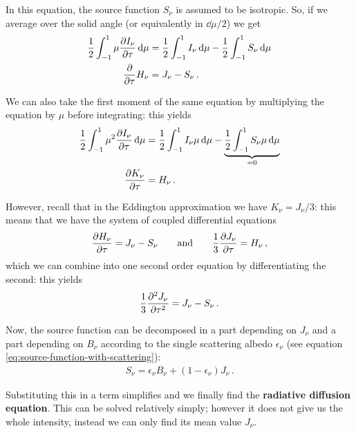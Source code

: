 \documentclass[main.tex]{subfiles}
\begin{document}

In this equation, the source function \(S_\nu \) is assumed to be isotropic. So, if we average over the solid angle (or equivalently in \(\dd{\mu } / 2\)) we get  
%
\begin{align}
\frac{1}{2}\int_{-1}^{1} \mu \pdv{I_\nu }{\tau } \dd{\mu } &= \frac{1}{2}\int_{-1}^{1} I_\nu \dd{\mu }
- \frac{1}{2}\int_{-1}^{1} S_\nu \dd{\mu } \\
\pdv{}{\tau } H_\nu  &= J_\nu - S_\nu 
\,.
\end{align}

We can also take the first moment of the same equation by multiplying the equation by \(\mu \) before integrating: this yields 
%
\begin{align}
\frac{1}{2}\int_{-1}^{1} \mu^2 \pdv{I_\nu }{\tau } \dd{\mu } &= \frac{1}{2}\int_{-1}^{1} I_\nu \mu  \dd{\mu }
- \underbrace{\frac{1}{2}\int_{-1}^{1} S_\nu \mu \dd{\mu }}_{= 0 }  \\
\pdv{K_\nu }{\tau } &= H_\nu 
\,.
\end{align}

However, recall that in the Eddington approximation we have \(K_\nu = J_\nu / 3\): this means that we have the system of coupled differential equations 
%
\begin{align}
\pdv{H_\nu }{\tau } = J_\nu - S_\nu 
\qquad \text{and} \qquad
\frac{1}{3} \pdv{J_\nu }{\tau } = H_\nu  
\,,
\end{align}
%
which we can combine into one second order equation by differentiating the second: this yields 
%
\begin{align}
\frac{1}{3}\pdv[2]{J_\nu }{\tau } = J_\nu - S_\nu 
\,.
\end{align}

Now, the source function can be decomposed in a part depending on \(J_\nu \) and a part depending on \(B_\nu \) according to the single scattering albedo \(\epsilon_{\nu }\) (see equation \eqref{eq:source-function-with-scattering}): 
%
\begin{align}
S_\nu = \epsilon_{\nu } B_\nu + (1 - \epsilon_{\nu }) J_\nu 
\,.
\end{align}

Substituting this in a term simplifies and we finally find 
%
%
the \textbf{radiative diffusion equation}. 
This can be solved relatively simply; however it does not give us the whole intensity, instead we can only find its mean value \(J_\nu \). 
\end{document}
